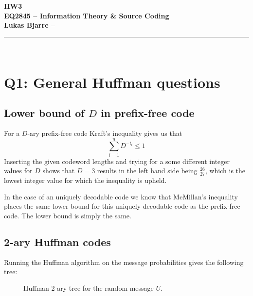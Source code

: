 \documentclass{article}
\begin{document}
\begin{center}
  \textbf{
    \LARGE HW3 \\
    \large EQ2845 -- Information Theory \& Source Coding \\
           Lukas Bjarre -- 
  }
  \rule{0.75\textwidth}{0.4pt} \\
\end{center}

\section{Q1: General Huffman questions}

\subsection{Lower bound of $D$ in prefix-free code}
For a $D$-ary prefix-free code Kraft's inequality gives us that 
\begin{equation}
  \sum_{i=1}^n D^{-l_i} \leq 1
  \label{eq:kraft}
\end{equation}
Inserting the given codeword lengths and trying for a some different integer values for $D$
shows that $D=3$ results in the left hand side being $\frac{26}{27}$,
which is the lowest integer value for which the inequality is upheld.

In the case of an uniquely decodable code we know that McMillan's inequality places the same
lower bound for this uniquely decodable code as the prefix-free code.
The lower bound is simply the same.

\subsection{2-ary Huffman codes}
Running the Huffman algorithm on the message probabilities gives the following tree:
\begin{figure}[!ht]
  \centering
  \caption{Huffman 2-ary tree for the random message $U$.}
  \label{fig:hufftree1}
\end{figure}
\end{document}
